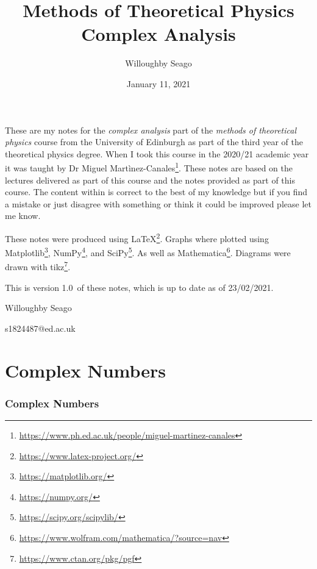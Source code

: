 \documentclass{article}
\author{Willoughby Seago}
\date{January 11, 2021}
\title{
    Methods of Theoretical Physics\\
    {\Large Complex Analysis}
}
\newcommand{\notesVersion}{1.0}
\newcommand{\notesDate}{23/02/2021}
\begin{document}
    \maketitle
    These are my notes for the \textit{complex analysis} part of the \textit{methods of theoretical physics} course from the University of Edinburgh as part of the third year of the theoretical physics degree.
    When I took this course in the 2020/21 academic year it was taught by Dr Miguel Mart\`inez-Canales\footnote{\url{https://www.ph.ed.ac.uk/people/miguel-martinez-canales}}.
    These notes are based on the lectures delivered as part of this course and the notes provided as part of this course.
    The content within is correct to the best of my knowledge but if you find a mistake or just disagree with something or think it could be improved please let me know.
    
    These notes were produced using \LaTeX\footnote{\url{https://www.latex-project.org/}}.
    Graphs where plotted using Matplotlib\footnote{\url{https://matplotlib.org/}}, NumPy\footnote{\url{https://numpy.org/}}, and SciPy\footnote{\url{https://scipy.org/scipylib/}}.
    As well as Mathematica\footnote{\url{https://www.wolfram.com/mathematica/?source=nav}}.
    Diagrams were drawn with tikz\footnote{\url{https://www.ctan.org/pkg/pgf}}.
    
    This is version \notesVersion~of these notes, which is up to date as of \notesDate.
    \begin{flushright}
        Willoughby Seago
        
        s1824487@ed.ac.uk
    \end{flushright}
    \clearpage
    \tableofcontents
    \listoffigures
    \printglossary[type=\acronymtype, title=Acronyms]
    \clearpage
    \begingroup
    \let\clearpage\relax  %
    \endgroup
    \part{Complex Numbers}
    \section{Complex Numbers}
\end{document}
